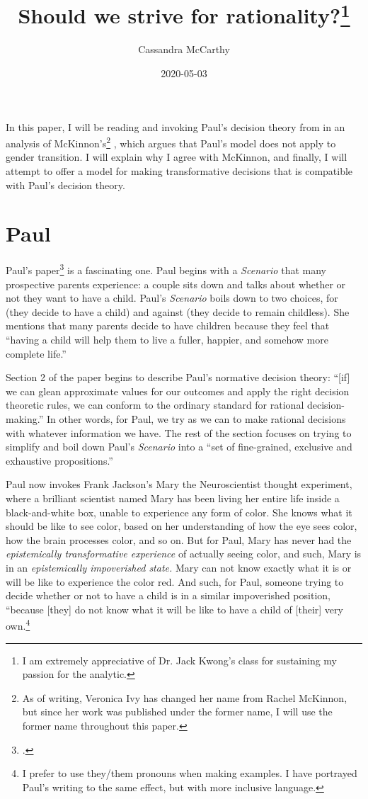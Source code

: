 \documentclass[12pt]{article}
\title{Should we strive for rationality?\thanks{I am extremely appreciative of Dr. Jack Kwong's
    class for sustaining my passion for the analytic.}}
\author{Cassandra McCarthy}
\date{2020-05-03}
\begin{document}
\maketitle

In this paper, I will be reading and invoking Paul's decision theory from
 in an analysis of McKinnon's\footnote{As of writing, Veronica Ivy has
changed her name from Rachel McKinnon, but since her work was published under the former name, I
will use the former name throughout this paper.} , which
argues that Paul's model does not apply to gender transition. I will explain why I agree with
McKinnon, and finally, I will attempt to offer a model for making transformative decisions that is
compatible with Paul's decision theory. 

\section{Paul}

Paul's paper\footcite{paul_what_2015-1} is a fascinating one. Paul begins with a \textit{Scenario}
that many prospective parents experience: a couple sits down and talks about whether or not they
want to have a child. Paul's \textit{Scenario} boils down to two choices, for (they decide to have a
child) and against (they decide to remain childless). She mentions that many parents decide to have
children because they feel that ``having a child will help them to live a fuller, happier, and
somehow more complete life.'' 

Section 2 of the paper begins to describe Paul's normative decision theory: ``[if] we can glean
approximate values for our outcomes and apply the right decision theoretic rules, we can conform to
the ordinary standard for rational decision-making.'' In other words, for Paul, we try as we can to
make rational decisions with whatever information we have. The rest of the section focuses on trying
to simplify and boil down Paul's \textit{Scenario} into a ``set of fine-grained, exclusive and
exhaustive propositions.''

Paul now invokes Frank Jackson's Mary the Neuroscientist thought experiment, where a brilliant
scientist named Mary has been living her entire life inside a black-and-white box, unable to
experience any form of color. She knows what it should be like to see color, based on her
understanding of how the eye sees color, how the brain processes color, and so on. But for Paul,
Mary has never had the \textit{epistemically transformative experience} of actually seeing color,
and such, Mary is in an \textit{epistemically impoverished state.} Mary can not know exactly what it
is or will be like to experience the color red. And such, for Paul, someone trying to decide whether
or not to have a child is in a similar impoverished position, ``because [they] do not know what it
will be like to have a child of [their] very own.\footnote{I prefer to use they/them pronouns when
making examples. I have portrayed Paul's writing to the same effect, but with more inclusive
language.}
\end{document}
